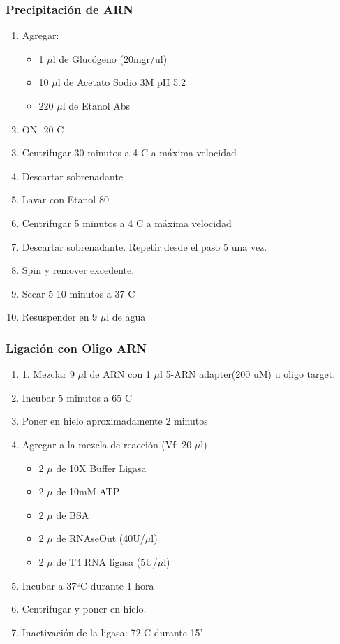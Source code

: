 \subsubsection{Precipitación de ARN}

\begin{enumerate}
	\item Agregar:
		\begin{itemize}
			\item 1 $\mu$l de Glucógeno (20mgr/ul)
			\item 10 $\mu$l de Acetato Sodio 3M pH 5.2
			\item 220 $\mu$l de Etanol Abs
	\end{itemize}

	\item ON -20 \degree C
	\item Centrifugar 30 minutos a 4 \degree C a máxima velocidad
	\item Descartar sobrenadante
	\item Lavar con Etanol 80%
	\item Centrifugar 5 minutos a 4 \degree C a máxima velocidad
	\item Descartar sobrenadante. Repetir desde el paso 5 una vez. 
	\item Spin y remover excedente.
	\item Secar 5-10 minutos a 37 \degree C
	\item Resuspender en 9 $\mu$l de agua
\end{enumerate}

\subsubsection{Ligación con Oligo ARN}

\begin{enumerate}
	\item 1. Mezclar 9 $\mu$l de ARN  con 1 $\mu$l 5-ARN  adapter(200 uM) u oligo target.
	\item Incubar 5 minutos a 65 \degree C
	\item Poner en hielo aproximadamente 2 minutos
	\item Agregar a la mezcla de reacción (Vf: 20 $\mu$l)
		\begin{itemize}
			\item 2  $\mu$ de 10X Buffer Ligasa
			\item 2  $\mu$ de 10mM ATP
			\item 2  $\mu$ de BSA
			\item 2  $\mu$ de RNAseOut (40U/$\mu$l)
			\item 2  $\mu$ de T4 RNA ligasa (5U/$\mu$l)
		\end{itemize}
	\item Incubar a 37ºC durante 1 hora
	\item Centrifugar y poner en hielo.
	\item Inactivación de la ligasa: 72 \degree C durante 15'
\end{enumerate}

